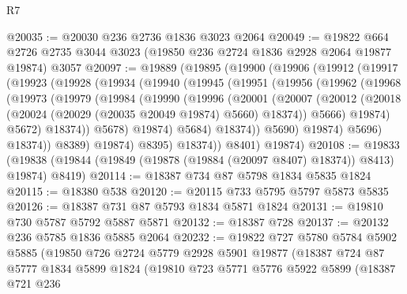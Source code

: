 \begin{lexlean}{R7}
\begin{coremodule}
@20035 := @20030 @236 @2736 @1836 @3023 @2064
@20049 := @19822
    @664
    @2726
    @2735
    @3044
    @3023
    (@19850 @236 @2724 @1836 @2928 @2064 @19877 @19874)
    @3057
@20097 := @19889
    (@19895
      (@19900
        (@19906
          (@19912
            (@19917
              (@19923
                (@19928
                  (@19934
                    (@19940
                      (@19945
                        (@19951
                          (@19956
                            (@19962
                              (@19968
                                (@19973
                                  (@19979
                                    (@19984
                                      (@19990
                                        (@19996
                                          (@20001
                                            (@20007
                                              (@20012
                                                (@20018
                                                  (@20024
                                                    (@20029 (@20035 @20049 @19874) @5660)
                                                    @18374))
                                                @5666)
                                              @19874)
                                            @5672)
                                          @18374))
                                      @5678)
                                    @19874)
                                  @5684)
                                @18374))
                            @5690)
                          @19874)
                        @5696)
                      @18374))
                  @8389)
                @19874)
              @8395)
            @18374))
        @8401)
      @19874)
@20108 := @19833
    (@19838 (@19844 (@19849 (@19878 (@19884 (@20097 @8407) @18374)) @8413) @19874) @8419)
@20114 := @18387 @734 @87 @5798 @1834 @5835 @1824
@20115 := @18380 @538
@20120 := @20115 @733 @5795 @5797 @5873 @5835
@20126 := @18387 @731 @87 @5793 @1834 @5871 @1824
@20131 := @19810 @730 @5787 @5792 @5887 @5871
@20132 := @18387 @728
@20137 := @20132 @236 @5785 @1836 @5885 @2064
@20232 := @19822
    @727
    @5780
    @5784
    @5902
    @5885
    (@19850
      @726
      @2724
      @5779
      @2928
      @5901
      @19877
      (@18387
        @724
        @87
        @5777
        @1834
        @5899
        @1824
        (@19810
          @723
          @5771
          @5776
          @5922
          @5899
          (@18387
            @721
            @236

\end{coremodule}
\end{lexlean}
